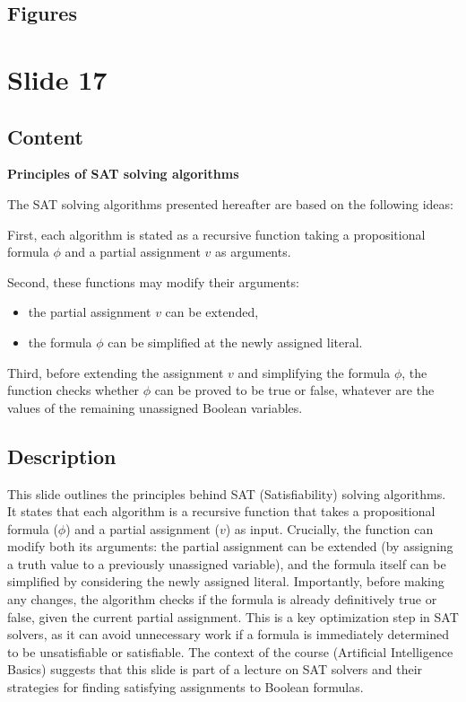 \documentclass{article}%
\begin{document}
\subsection{Figures}%
\begin{figure}[H]%
\centering%
\end{figure}

%
\newpage%
\section{Slide 17}%
\label{sec:Slide17}%
\subsection{Content}%

\textbf{Principles of SAT solving algorithms}

The SAT solving algorithms presented hereafter are based on the following ideas:

First, each algorithm is stated as a recursive function taking a propositional formula $\phi$ and a partial assignment $v$ as arguments.

Second, these functions may modify their arguments:
\begin{itemize}
    \item the partial assignment $v$ can be extended,
    \item the formula $\phi$ can be simplified at the newly assigned literal.
\end{itemize}

Third, before extending the assignment $v$ and simplifying the formula $\phi$, the function checks whether $\phi$ can be proved to be true or false, whatever are the values of the remaining unassigned Boolean variables.
%
\subsection{Description}%
This slide outlines the principles behind SAT (Satisfiability) solving algorithms.  It states that each algorithm is a recursive function that takes a propositional formula ($\phi$) and a partial assignment ($v$) as input.  Crucially, the function can modify both its arguments:  the partial assignment can be extended (by assigning a truth value to a previously unassigned variable), and the formula itself can be simplified by considering the newly assigned literal.  Importantly, before making any changes, the algorithm checks if the formula is already definitively true or false, given the current partial assignment.  This is a key optimization step in SAT solvers, as it can avoid unnecessary work if a formula is immediately determined to be unsatisfiable or satisfiable. The context of the course (Artificial Intelligence Basics) suggests that this slide is part of a lecture on SAT solvers and their strategies for finding satisfying assignments to Boolean formulas.%
\end{document}
